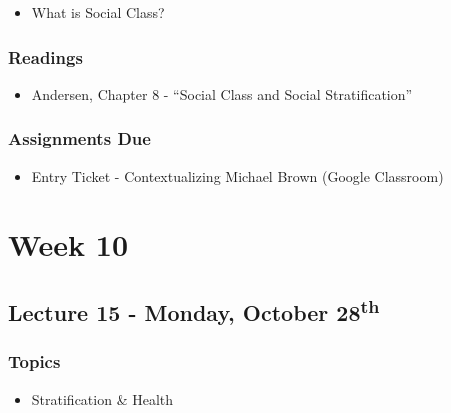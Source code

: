 \documentclass[]{book}
\providecommand{\tightlist}{%
  \setlength{\itemsep}{0pt}\setlength{\parskip}{0pt}}
\begin{document}
\begin{itemize}
\tightlist
\item
  What is Social Class?
\end{itemize}

\hypertarget{readings-16}{%
\subsubsection*{Readings}\label{readings-16}}

\begin{itemize}
\tightlist
\item
  Andersen, Chapter 8 - ``Social Class and Social Stratification''
\end{itemize}

\hypertarget{assignments-due-3}{%
\subsubsection*{Assignments Due}\label{assignments-due-3}}

\begin{itemize}
\tightlist
\item
  Entry Ticket - Contextualizing Michael Brown (Google Classroom)
\end{itemize}

\hypertarget{week-10}{%
\section*{Week 10}\label{week-10}}

\hypertarget{lecture-15---monday-october-28th}{%
\subsection*{\texorpdfstring{Lecture 15 - Monday, October 28\textsuperscript{th}}{Lecture 15 - Monday, October 28th}}\label{lecture-15---monday-october-28th}}

\hypertarget{topics-18}{%
\subsubsection*{Topics}\label{topics-18}}

\begin{itemize}
\tightlist
\item
  Stratification \& Health
\end{itemize}
\end{document}
